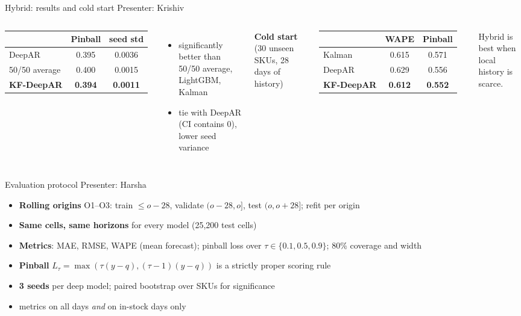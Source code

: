\documentclass[aspectratio=169,10pt]{beamer}
\newcommand{\who}[1]{\hfill{\small\color{gray}Presenter: #1}}
\begin{document}
\begin{frame}{Hybrid: results and cold start \who{Krishiv}}
\begin{columns}[T]
\begin{tabular}{lcc}
\toprule
& Pinball & seed std\\
\midrule
DeepAR & 0.395 & 0.0036\\
50/50 average & 0.400 & 0.0015\\
\textbf{KF-DeepAR} & \textbf{0.394} & \textbf{0.0011}\\
\bottomrule
\end{tabular}
\begin{itemize}
\item significantly better than 50/50 average, LightGBM, Kalman
\item tie with DeepAR (CI contains 0), lower seed variance
\end{itemize}
\textbf{Cold start} (30 unseen SKUs, 28 days of history)\\[1mm]
\begin{tabular}{lcc}
\toprule
& WAPE & Pinball\\
\midrule
Kalman & 0.615 & 0.571\\
DeepAR & 0.629 & 0.556\\
\textbf{KF-DeepAR} & \textbf{0.612} & \textbf{0.552}\\
\bottomrule
\end{tabular}

\medskip
Hybrid is best when local history is scarce.
\end{columns}
\end{frame}

\begin{frame}{Evaluation protocol \who{Harsha}}
\begin{itemize}
\item \textbf{Rolling origins} O1--O3: train $\le o-28$, validate $(o-28,o]$, test $(o,o+28]$; refit per origin
\item \textbf{Same cells, same horizons} for every model (25{,}200 test cells)
\item \textbf{Metrics}: MAE, RMSE, WAPE (mean forecast); pinball loss over $\tau\in\{0.1,0.5,0.9\}$; 80\% coverage and width
\item \textbf{Pinball} $L_\tau=\max(\tau(y-q),(\tau-1)(y-q))$ is a \alert{strictly proper} scoring rule
\item \textbf{3 seeds} per deep model; paired bootstrap over SKUs for significance
\item metrics on all days \emph{and} on in-stock days only
\end{itemize}
\end{frame}
\end{document}
